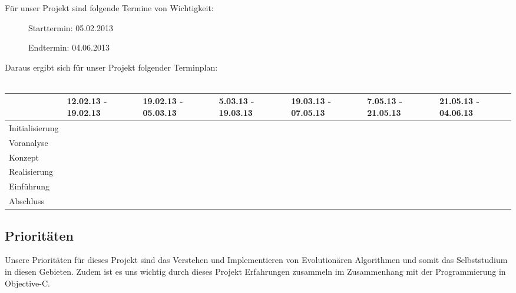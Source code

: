	Für unser Projekt sind folgende Termine von Wichtigkeit:
	\begin{description}
		\item[] Starttermin: 05.02.2013
		\item[] Endtermin: 04.06.2013
	\end{description}
	Daraus ergibt sich für unser Projekt folgender Terminplan:
	\\ \\
	\tiny{
	\begin{tabular}{| p{2cm} | p{1cm} | p{1cm} | p{1cm} | p{1cm} | p{1cm} | p{1cm} |}
	\hline
	\rowcolor[gray]{0.9}  & 12.02.13 - 19.02.13 & 19.02.13 - 05.03.13 & 5.03.13 - 19.03.13 & 19.03.13 - 07.05.13 & 7.05.13 - 21.05.13 & 21.05.13 - 04.06.13 \\
	\hline
	Initialisierung & \cellcolor{yellow} & & & & & \\
	\hline
	Voranalyse & &  \cellcolor{yellow}& & & & \\
	\hline
	Konzept & & &  \cellcolor{yellow}& & & \\
	\hline
	Realisierung & & & &  \cellcolor{yellow}& & \\
	\hline
	Einführung & & & & & \cellcolor{yellow}& \\
	\hline
	Abschluss & & & & &  &\cellcolor{yellow} \\
	\hline
	\end{tabular}	
	}
	\small{
	\subsection{Prioritäten}
	Unsere Prioritäten für dieses Projekt sind das Verstehen und Implementieren von Evolutionären Algorithmen und somit das Selbststudium in diesen Gebieten. Zudem ist es uns wichtig durch dieses Projekt Erfahrungen zusammeln im Zusammenhang mit der Programmierung in Objective-C. 
}